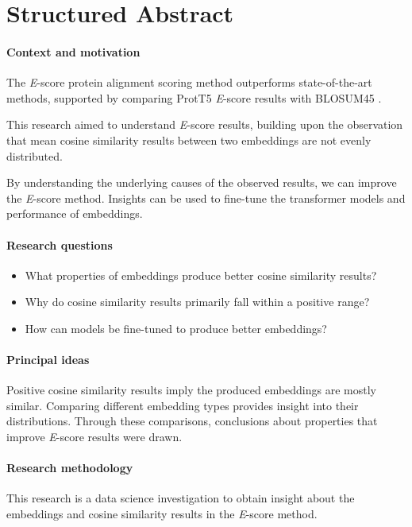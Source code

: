 \chapter*{Structured Abstract}

\subsubsection*{Context and motivation}
The \textit{E}-score protein alignment scoring method \autocite{Ashrafzadeh:2023} outperforms state-of-the-art methods, supported by comparing ProtT5 \autocite{Elnaggar:2021} \textit{E}-score results with BLOSUM45 \autocite{Henikoff:1992}.

This research aimed to understand \textit{E}-score results, building upon the observation that mean cosine similarity results between two embeddings are not evenly distributed.

By understanding the underlying causes of the observed results, we can improve the \textit{E}-score method. Insights can be used to fine-tune the transformer models \autocite{Elnaggar:2021, Rives:2021} and performance of embeddings.

\subsubsection*{Research questions}
\begin{itemize}
    \item{What properties of embeddings produce better cosine similarity results?}
    \item{Why do cosine similarity results primarily fall within a positive range?}
    \item{How can models be fine-tuned to produce better embeddings?}
\end{itemize}

\subsubsection*{Principal ideas}
Positive cosine similarity results imply the produced embeddings are mostly similar. Comparing different embedding types provides insight into their distributions. Through these comparisons, conclusions about properties that improve \textit{E}-score results were drawn.

\subsubsection*{Research methodology}
This research is a data science investigation to obtain insight about the embeddings and cosine similarity results in the \textit{E}-score method.

